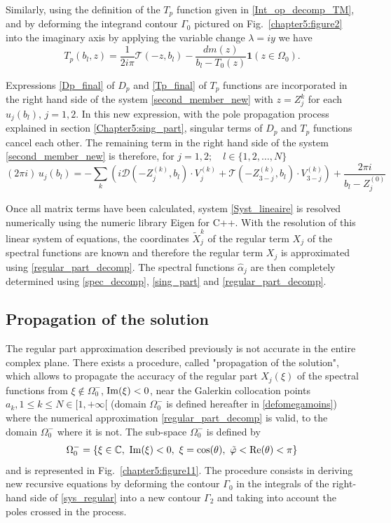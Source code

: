 Similarly, using the definition of the $T_p$ function given in \eqref{Int_op_decomp_TM}, and by deforming the integrand contour $\Gamma_0$ pictured on Fig.~\ref{chapter5:figure2} into the imaginary axis by applying the variable change $\lambda = iy$ we have
\begin{equation}
\label{Tp_final}
T_p(b_l,z) = 
\dfrac{1}{2i\pi} \mathcal T(-z,b_l) - \dfrac{dm(z)}{b_l - T_0(z)} \mathbf{1} (z \in \Omega_0) .
\end{equation}

Expressions \eqref{Dp_final} of $D_p$ and \eqref{Tp_final} of $T_p$ functions are incorporated in the right hand side of the system \eqref{second_member_new} with $z = Z_j^k$ for each $u_j(b_l), \, j=1,2$. In this new expression, with the pole propagation process explained in section \ref{Chapter5:sing_part}, singular terms of $D_p$ and $T_p$ functions cancel each other. The remaining term in the right hand side of the system \eqref{second_member_new} is therefore, for $j=1,2; \quad l \in \{ 1,2, \ldots, N \}$
\begin{equation}
(2\pi i) \, u_j(b_l) =  - \sum_k \left( i \mathcal D(-Z_j^{(k)},b_l)\cdot V_j^{(k)}  + \mathcal T(-Z_{3-j}^{(k)},b_l) 
\cdot V_{3-j}^{(k)}  \right) +  \dfrac{2\pi i}{b_l - Z_j^{(0)}}
\end{equation}

Once all matrix terms have been calculated, system \eqref{Syst_lineaire} is resolved numerically using the numeric library Eigen for C++. With the resolution of this linear system of equations, the coordinates $\tilde{X}_j^k$ of the regular term $X_j$ of the spectral functions are known and therefore the regular term $X_j$ is approximated using \eqref{regular_part_decomp}. The spectral functions $\hat{\alpha}_j$ are then completely determined using \eqref{spec_decomp}, \eqref{sing_part} and \eqref{regular_part_decomp}. 

\subsection{Propagation of the solution}
\label{propag_sol}
The regular part approximation described previously is not accurate in the entire complex plane. There exists a procedure, called "propagation of the solution", which allows to propagate the accuracy of the regular part $X_j(\xi)$ of the spectral functions from $\xi \notin \Omega_0^-$, ${\rm Im} (\xi) <0$, near the Galerkin collocation points $a_k, 1\leq k \leq N \in \lbrack 1, +\infty \lbrack$ (domain $\Omega_0^-$ is defined hereafter in \eqref{defomegamoins}) where the numerical approximation \eqref{regular_part_decomp} is valid, to the domain $\Omega_0^-$ where it is not. The sub-space $\Omega_0^-$ is defined by
\begin{equation}
\label{defomegamoins}
\Omega_0^- = \{\xi \in \mathbb C, \ {\rm Im}(\xi) <0, \  \xi=\cos(\theta), \ \tilde{\varphi} < {\rm Re}(\theta)<\pi\}
\end{equation}
and is represented in Fig.~\ref{chapter5:figure11}. The procedure consists in deriving new recursive equations by deforming the  contour $\Gamma_0$ in the integrals of the right-hand side of \eqref{sys_regular} into a new contour $\Gamma_2$ and taking into account the poles crossed in the process.

